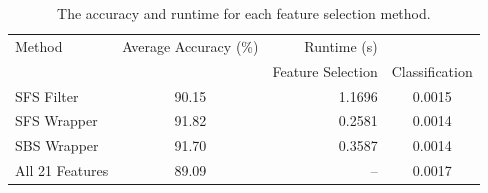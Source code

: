 \documentclass[]{article}
\begin{document}
	

\begin{table}[h]
	\begin{center}
	 \caption{The accuracy and runtime for each feature selection method.}
	 \begin{tabular}{ | l | c | r  c  |}
	    \hline
	    Method & Average Accuracy (\%) & Runtime (s) &\\ 
	     &  & Feature Selection & Classification\\ 
	    \hline
	    
	    SFS Filter & 90.15 & 1.1696 & 0.0015 \\ 
	    SFS Wrapper & 91.82 & 0.2581 & 0.0014 \\
	    SBS Wrapper & 91.70 & 0.3587 & 0.0014\\
	    All 21 Features & 89.09 & -- & 0.0017\\
	    \hline    
	 \end{tabular}
	    \label{table:sfssbstable}
	\end{center}
\end{table}
\end{document}
